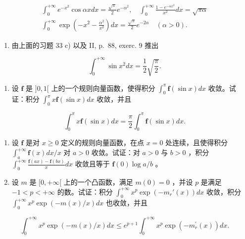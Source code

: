 \[
\begin{array}{l} \int_ {0} ^ {+ \infty} e ^ {- x ^ {2}} \cos \alpha x d x = \frac {\sqrt {\pi}}{2} e ^ {- \alpha^ {2}}, \quad \int_ {0} ^ {+ \infty} \frac {1 - e ^ {- \alpha x ^ {2}}}{x ^ {2}} d x = \sqrt {\pi \alpha} \\ \int_ {0} ^ {+ \infty} \exp \left(- x ^ {2} - \frac {\alpha^ {2}}{x ^ {2}}\right) d x = \frac {\sqrt {\pi}}{2} e ^ {- 2 \alpha} \quad (\alpha > 0). \end{array}
\]

\begin{enumerate}
\def\labelenumi{\arabic{enumi})}
\setcounter{enumi}{35}
\tightlist
\item
  由上面的习题 33 c) 以及 II, p.~88, exerc. 9 推出
\end{enumerate}

\[
\int_ {0} ^ {+ \infty} \sin x ^ {2} d x = \frac {1}{2} \sqrt {\frac {\pi}{2}}.
\]

\begin{enumerate}
\def\labelenumi{\arabic{enumi})}
\setcounter{enumi}{36}
\tightlist
\item
  设 \(\mathbf{f}\) 是 \(]0, 1[\) 上的一个规则向量函数，使得积分 \(\int_0^\pi \mathbf{f}(\sin x) dx\) 收敛。试证：积分 \(\int_0^\pi x \mathbf{f}(\sin x) dx\) 收敛，并且
\end{enumerate}

\[
\int_ {0} ^ {\pi} x \mathbf {f} (\sin x) d x = \frac {\pi}{2} \int_ {0} ^ {\pi} \mathbf {f} (\sin x) d x.
\]

\begin{enumerate}
\def\labelenumi{\arabic{enumi})}
\setcounter{enumi}{37}
\item
  设 \(\mathbf{f}\) 是对 \(x \geqslant 0\) 定义的规则向量函数，在点 \(x = 0\) 处连续，且使得积分 \(\int_{a}^{+\infty} \mathbf{f}(x) dx / x\) 对 \(a > 0\) 收敛。试证：对 \(a > 0\) 与 \(b > 0\) ，积分 \(\int_{0}^{+\infty} \frac{\mathbf{f}(ax) - \mathbf{f}(bx)}{x} dx\) 收敛且等于 \(\mathbf{f}(0) \log a / b\) 。
\item
  设 \(m\) 是 \([0, +\infty[\) 上的一个凸函数，满足 \(m(0) = 0\) ，并设 \(p\) 是满足 \(-1 < p < +\infty\) 的数。试证：积分 \(\int_0^{+\infty} x^p \exp(-m_r'(x)) dx\) 收敛，积分 \(\int_0^{+\infty} x^p \exp(-m(x)/x) dx\) 也收敛，并且
\end{enumerate}

\[
\int_ {0} ^ {+ \infty} x ^ {p} \exp (- m (x) / x) d x \leqslant e ^ {p + 1} \int_ {0} ^ {+ \infty} x ^ {p} \exp (- m _ {r} ^ {\prime} (x)) d x.
\]


